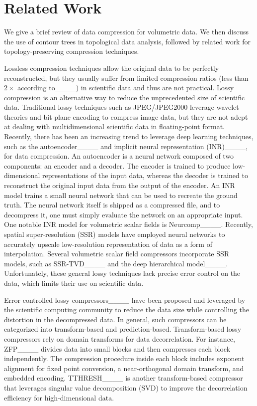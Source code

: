 \section{Related Work}
\label{sec:related-work}

We give a brief review of data compression for volumetric data. 
We then discuss the use of contour trees in topological data analysis, followed by related work for topology-preserving compression techniques.   

Lossless compression techniques allow the original data to be perfectly reconstructed, 
but they usually suffer from limited compression ratios (less than $2\times$ according to____) in scientific data and thus are not practical. 
Lossy compression is an alternative way to reduce the unprecedented  size of scientific data. 
Traditional lossy techniques such as JPEG/JPEG2000 leverage wavelet theories and bit plane encoding to compress image data, but they are not adept at dealing with multidimensional scientific data in floating-point format. 
Recently, there has been an increasing trend to leverage deep learning techniques, such as the autoencoder____ and implicit neural representation (INR)____, for data compression.
An autoencoder is a neural network composed of two components: an encoder and a decoder. 
The encoder is trained to produce low-dimensional representations of the input data, whereas the decoder is trained to reconstruct the original input data from the output of the encoder. 
An INR model trains a small neural network that can be used to recreate the ground truth. 
The neural network itself is shipped as a compressed file, and to decompress it, one must simply evaluate the network on an appropriate input. 
One notable INR model for volumetric scalar fields is Neurcomp____.
Recently, spatial super-resolution (SSR) models have employed neural networks to accurately upscale low-resolution representation of data as a form of interpolation. 
Several volumetric scalar field compressors incorporate SSR models, such as SSR-TVD____ and the deep hierarchical model____.
Unfortunately, these general lossy techniques lack precise error control on the data, which limits their use on scientific data.


Error-controlled lossy compressors____ have been proposed and leveraged by the scientific computing community to reduce the data size while controlling the distortion in the decompressed data. 
In general, such compressors can be categorized into transform-based and prediction-based. 
Transform-based lossy compressors rely on domain transforms for data decorrelation. 
For instance, ZFP____ divides data into small blocks and then compresses each block independently. The compression procedure inside each block includes exponent alignment for fixed point conversion, a near-orthogonal domain transform, and embedded encoding. 
TTHRESH____ is another transform-based compressor that leverages singular value decomposition (SVD) to improve the decorrelation efficiency for high-dimensional data.

